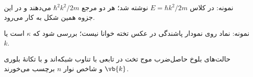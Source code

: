 \begin{discrepancy}
نمونه: در کلاس $E=\hbar k^2/2m$ نوشته شد؛ هر دو مرجع $\hbar^2k^2/2m$ می‌دهند و در این جزوه همین شکل به کار می‌رود.
\end{discrepancy}

\begin{todobox}
نمونه: نماد روی نمودار پاشندگی در عکس تخته خوانا نیست؛ بررسی شود که $\kappa$ است یا $k$.
\end{todobox}

\begin{summarybox}
حالت‌های بلوخ حاصل‌ضرب موج تخت در تابعی با تناوب شبکه‌اند و با تکانهٔ بلوری $\vb{k}$ و شاخص نوار $n$ برچسب می‌خورند.
\end{summarybox}

